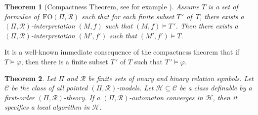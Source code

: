 \documentclass[copyright,creativecommons]{eptcs}
\newtheorem{theorem}{Theorem}[section]
\begin{document}
\begin{theorem}[Compactness Theorem, see for example \cite{ebbinghaus}]
Assume $T$ is a set of formulae of\,  $\mathrm{FO}(\Pi,\mathcal{R})$ such that for each finite
subset $T\, '$ of\, $T$, there exists a $(\Pi,\mathcal{R})$-interpretation $(M,f)$ such that $(M,f)\models T\, '$.
Then there exists a  $(\Pi,\mathcal{R})$-interpretation $(M',f')$ such that $(M',f')\models T$.
\end{theorem}




It is a well-known immediate consequence of the compactness theorem that if $T\models\varphi$,
then there is a finite subset $T\, '$ of $T$ such that $T\, '\models\varphi$.




\begin{theorem}\label{maintheorem}
Let $\Pi$ and $\mathcal{R}$ be finite sets of unary
and binary relation symbols.
Let $\mathcal{C}$ be the class of all pointed $(\Pi,\mathcal{R})$-models. Let $\mathcal{H}\subseteq\mathcal{C}$
be a class definable by a first-order $(\Pi,\mathcal{R})$-theory.
If a $(\Pi,\mathcal{R})$-automaton converges in $\mathcal{H}$, then it
specifies a local algorithm in $\mathcal{H}$.
\end{theorem}
\end{document}
